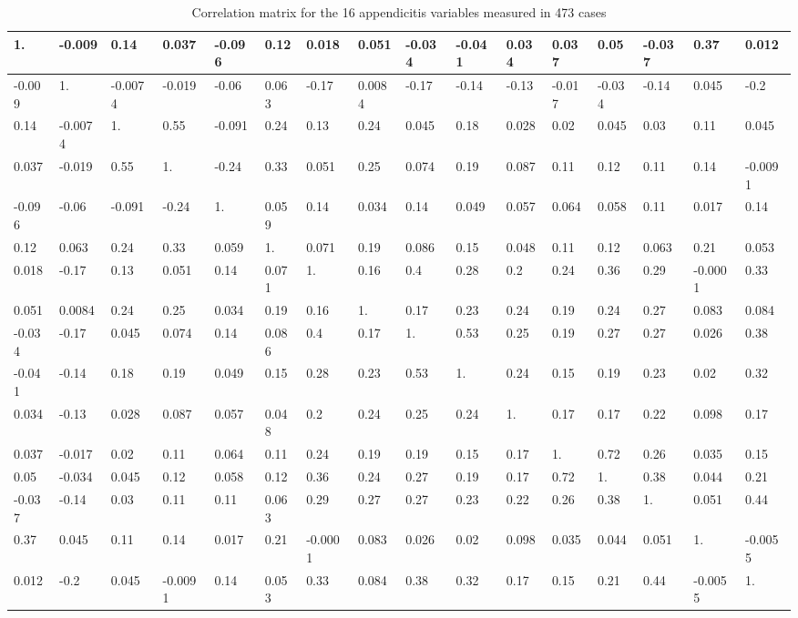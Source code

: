 \documentclass[10pt]{book}
\begin{document}
\begin{table}[ht]
\centering
\caption{Correlation matrix for the 16 appendicitis variables measured in 473 cases}
\begin{tabular}{|l|l|l|l|l|l|l|l|l|l|l|l|l|l|l|l|}
\hline
1. & -0.009 & 0.14 & 0.037 & -0.096 & 0.12 & 0.018 & 0.051 & -0.034 & -0.041 & 0.034 & 0.037 & 0.05 & -0.037 & 0.37 & 0.012 \\
\hline
-0.009 & 1. & -0.0074 & -0.019 & -0.06 & 0.063 & -0.17 & 0.0084 & -0.17 & -0.14 & -0.13 & -0.017 & -0.034 & -0.14 & 0.045 & -0.2 \\
\hline
0.14 & -0.0074 & 1. & 0.55 & -0.091 & 0.24 & 0.13 & 0.24 & 0.045 & 0.18 & 0.028 & 0.02 & 0.045 & 0.03 & 0.11 & 0.045 \\
\hline
0.037 & -0.019 & 0.55 & 1. & -0.24 & 0.33 & 0.051 & 0.25 & 0.074 & 0.19 & 0.087 & 0.11 & 0.12 & 0.11 & 0.14 & -0.0091 \\
\hline
-0.096 & -0.06 & -0.091 & -0.24 & 1. & 0.059 & 0.14 & 0.034 & 0.14 & 0.049 & 0.057 & 0.064 & 0.058 & 0.11 & 0.017 & 0.14 \\
\hline
0.12 & 0.063 & 0.24 & 0.33 & 0.059 & 1. & 0.071 & 0.19 & 0.086 & 0.15 & 0.048 & 0.11 & 0.12 & 0.063 & 0.21 & 0.053 \\
\hline
0.018 & -0.17 & 0.13 & 0.051 & 0.14 & 0.071 & 1. & 0.16 & 0.4 & 0.28 & 0.2 & 0.24 & 0.36 & 0.29 & -0.0001 & 0.33 \\
\hline
0.051 & 0.0084 & 0.24 & 0.25 & 0.034 & 0.19 & 0.16 & 1. & 0.17 & 0.23 & 0.24 & 0.19 & 0.24 & 0.27 & 0.083 & 0.084 \\
\hline
-0.034 & -0.17 & 0.045 & 0.074 & 0.14 & 0.086 & 0.4 & 0.17 & 1. & 0.53 & 0.25 & 0.19 & 0.27 & 0.27 & 0.026 & 0.38 \\
\hline
-0.041 & -0.14 & 0.18 & 0.19 & 0.049 & 0.15 & 0.28 & 0.23 & 0.53 & 1. & 0.24 & 0.15 & 0.19 & 0.23 & 0.02 & 0.32 \\
\hline
0.034 & -0.13 & 0.028 & 0.087 & 0.057 & 0.048 & 0.2 & 0.24 & 0.25 & 0.24 & 1. & 0.17 & 0.17 & 0.22 & 0.098 & 0.17 \\
\hline
0.037 & -0.017 & 0.02 & 0.11 & 0.064 & 0.11 & 0.24 & 0.19 & 0.19 & 0.15 & 0.17 & 1. & 0.72 & 0.26 & 0.035 & 0.15 \\
\hline
0.05 & -0.034 & 0.045 & 0.12 & 0.058 & 0.12 & 0.36 & 0.24 & 0.27 & 0.19 & 0.17 & 0.72 & 1. & 0.38 & 0.044 & 0.21 \\
\hline
-0.037 & -0.14 & 0.03 & 0.11 & 0.11 & 0.063 & 0.29 & 0.27 & 0.27 & 0.23 & 0.22 & 0.26 & 0.38 & 1. & 0.051 & 0.44 \\
\hline
0.37 & 0.045 & 0.11 & 0.14 & 0.017 & 0.21 & -0.0001 & 0.083 & 0.026 & 0.02 & 0.098 & 0.035 & 0.044 & 0.051 & 1. & -0.0055 \\
\hline
0.012 & -0.2 & 0.045 & -0.0091 & 0.14 & 0.053 & 0.33 & 0.084 & 0.38 & 0.32 & 0.17 & 0.15 & 0.21 & 0.44 & -0.0055 & 1. \\
\hline
\end{tabular}
\end{table}
\end{document}
